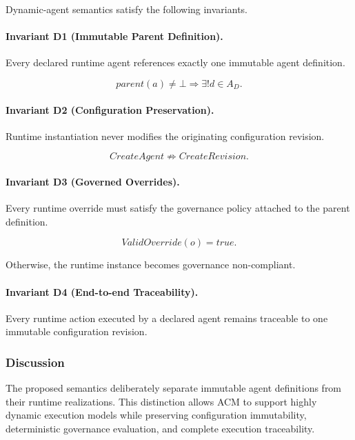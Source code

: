 \documentclass[10pt]{article}
\begin{document}
Dynamic-agent semantics satisfy the following invariants.

\paragraph{Invariant D1 (Immutable Parent Definition).}

Every declared runtime agent references exactly one immutable agent definition.

\[
parent(a)\neq\bot
\Longrightarrow
\exists ! d\in A_D.
\tag{36}
\]

\paragraph{Invariant D2 (Configuration Preservation).}

Runtime instantiation never modifies the originating configuration revision.

\[
CreateAgent
\not\Rightarrow
CreateRevision.
\tag{37}
\]

\paragraph{Invariant D3 (Governed Overrides).}

Every runtime override must satisfy the governance policy attached to the
parent definition.

\[
ValidOverride(o)=true.
\tag{38}
\]

Otherwise, the runtime instance becomes governance non-compliant.

\paragraph{Invariant D4 (End-to-end Traceability).}

Every runtime action executed by a declared agent remains traceable to one
immutable configuration revision.

\subsubsection{Discussion}

The proposed semantics deliberately separate immutable agent definitions from
their runtime realizations. This distinction allows ACM to support highly
dynamic execution models while preserving configuration immutability,
deterministic governance evaluation, and complete execution traceability.
\end{document}
